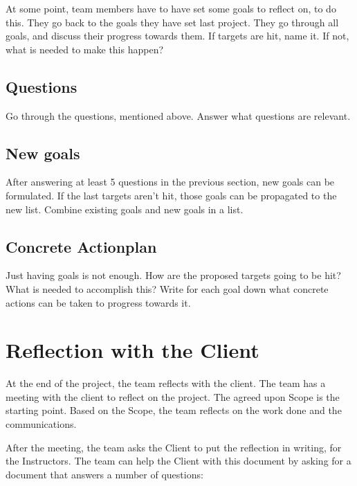 \documentclass[10pt]{report}
\begin{document}
At some point, team members have to have set some goals to reflect on, to do this. They go back to the goals they have set last project. They go through all goals, and discuss their progress towards them. If targets are hit, name it. If not, what is needed to make this happen?

\subsection{Questions}

Go through the questions, mentioned above. Answer what questions are relevant.

\subsection{New goals}

After answering at least 5 questions in the previous section, new goals can be formulated. If the last targets aren't hit, those goals can be propagated to the new list. Combine existing goals and new goals in a list.

\subsection{Concrete Actionplan}

Just having goals is not enough. How are the proposed targets going to be hit? What is needed to accomplish this? Write for each goal down what concrete actions can be taken to progress towards it.

\newpage

\section{Reflection with the Client}

At the end of the project, the team reflects with the client. The team has a meeting with the client to reflect on the project. The agreed upon Scope is the starting point. Based on the Scope, the team reflects on the work done and the communications. 

After the meeting, the team asks the Client to put the reflection in writing, for the Instructors. The team can help the Client with this document by asking for a document that answers a number of questions:
\end{document}
